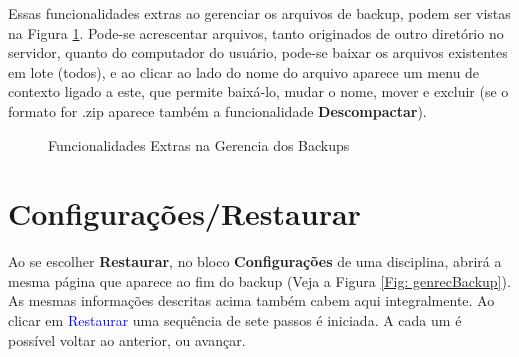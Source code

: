 Essas funcionalidades extras ao gerenciar os arquivos de backup, podem ser vistas na Figura \ref{Fig: genrecExtraBackup}. Pode-se acrescentar arquivos, tanto originados de outro diretório no servidor, quanto do computador do usuário, pode-se baixar os arquivos existentes em lote (todos), e ao clicar ao lado do nome do arquivo aparece um menu de contexto ligado a este, que permite baixá-lo, mudar o nome, mover e excluir (se o formato for .zip aparece também a funcionalidade \textbf{Descompactar}).

\begin{figure}[htbp]
 \begin{center}
  \caption{Funcionalidades Extras na Gerencia dos Backups}
  \label{Fig: genrecExtraBackup}
 \end{center}
\end{figure}

\section{Configurações/Restaurar}
\label{chap3:sec:restaurar}
Ao se escolher \textbf{Restaurar}, no bloco \textbf{Configurações} de uma disciplina, abrirá a mesma página que aparece ao fim do backup (Veja a Figura \ref{Fig: genrecBackup}).
As mesmas informações descritas acima também cabem aqui integralmente.
Ao clicar em \textcolor{blue}{Restaurar} uma sequência de sete passos é iniciada. A cada um é possível voltar ao anterior, ou avançar.

